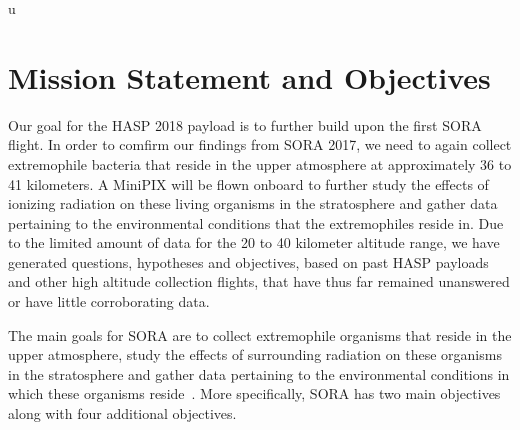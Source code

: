 u\section{Mission Statement and Objectives}
\label{sec:Introduction}

Our goal for the HASP 2018 payload is to further build upon the first SORA~\cite{SORA} flight.  In order to comfirm our findings from SORA 2017, we need to again collect extremophile bacteria that reside in the upper atmosphere at approximately 36 to 41 kilometers.  A MiniPIX will be flown onboard to further study the effects of ionizing radiation on these living organisms in the stratosphere and gather data pertaining to the environmental conditions that the extremophiles reside in. Due to the limited amount of data for the 20 to 40 kilometer altitude range, we have generated questions, hypotheses and objectives, based on past HASP payloads and other high altitude collection flights, that have thus far remained unanswered or have little corroborating data.


The main goals for SORA are to collect extremophile organisms that reside in the upper atmosphere, study the effects of surrounding radiation on these organisms in the stratosphere and gather data pertaining to the environmental conditions in which these organisms reside~\cite{SORA}.  More specifically, SORA has two main objectives along with four additional objectives.\\

